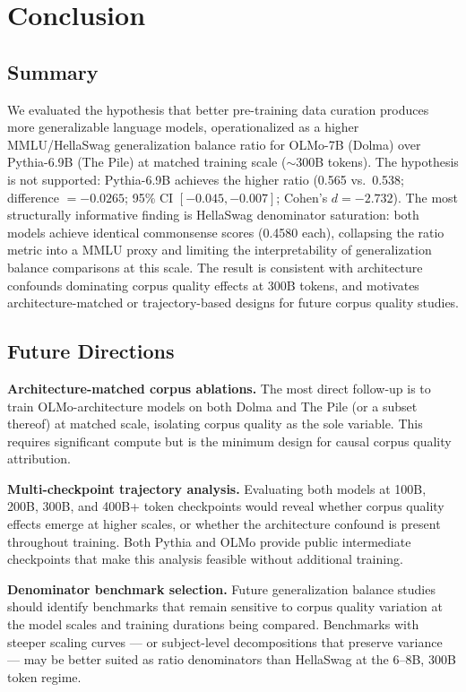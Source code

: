 \section{Conclusion}

\subsection{Summary}

We evaluated the hypothesis that better pre-training data curation produces more generalizable language models, operationalized as a higher MMLU/HellaSwag generalization balance ratio for OLMo-7B (Dolma) over Pythia-6.9B (The Pile) at matched training scale ($\sim$300B tokens). The hypothesis is not supported: Pythia-6.9B achieves the higher ratio (0.565 vs.\ 0.538; difference $= -0.0265$; 95\% CI $[-0.045, -0.007]$; Cohen's $d = -2.732$). The most structurally informative finding is HellaSwag denominator saturation: both models achieve identical commonsense scores (0.4580 each), collapsing the ratio metric into a MMLU proxy and limiting the interpretability of generalization balance comparisons at this scale. The result is consistent with architecture confounds dominating corpus quality effects at 300B tokens, and motivates architecture-matched or trajectory-based designs for future corpus quality studies.

\subsection{Future Directions}

\textbf{Architecture-matched corpus ablations.} The most direct follow-up is to train OLMo-architecture models on both Dolma and The Pile (or a subset thereof) at matched scale, isolating corpus quality as the sole variable. This requires significant compute but is the minimum design for causal corpus quality attribution.

\textbf{Multi-checkpoint trajectory analysis.} Evaluating both models at 100B, 200B, 300B, and 400B+ token checkpoints would reveal whether corpus quality effects emerge at higher scales, or whether the architecture confound is present throughout training. Both Pythia and OLMo provide public intermediate checkpoints that make this analysis feasible without additional training.

\textbf{Denominator benchmark selection.} Future generalization balance studies should identify benchmarks that remain sensitive to corpus quality variation at the model scales and training durations being compared. Benchmarks with steeper scaling curves --- or subject-level decompositions that preserve variance --- may be better suited as ratio denominators than HellaSwag at the 6--8B, 300B token regime.


